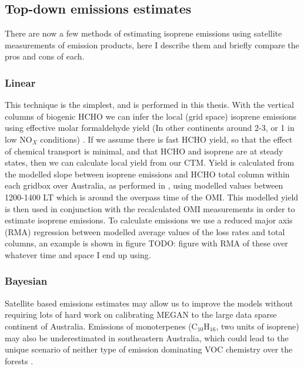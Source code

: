   \subsection{Top-down emissions estimates}
    There are now a few methods of estimating isoprene emissions using satellite measurements of emission products, here I describe them and briefly compare the pros and cons of each.
    
    \subsubsection{Linear}
      \label{BioIsop:intro:top_down_linear}
      
      This technique is the simplest, and is performed in this thesis.
      With the vertical columns of biogenic HCHO we can infer the local (grid space) isoprene emissions using effective molar formaldehyde yield (In other continents around 2-3, or 1 in low NO$_X$ conditions) \parencite{Palmer2003,Marais2012,Bauwens2016}.
      If we assume there is fast HCHO yield, so that the effect of chemical transport is minimal, and that HCHO and isoprene are at steady states, then we can calculate local yield from our CTM.
      Yield is calculated from the modelled slope between isoprene emissions and HCHO total column within each gridbox over Australia, as performed in \textcite{Palmer2003}, using modelled values between 1200-1400 LT which is around the overpass time of the OMI.
      This modelled yield is then used in conjunction with the recalculated OMI measurements in order to estimate isoprene emissions.
      To calculate emissions we use a reduced major axis (RMA) regression between modelled average values of the loss rates and total columns, an example is shown in figure TODO: figure with RMA of these over whatever time and space I end up using.
      
    
    \subsubsection{Bayesian}
      Satellite based emissions estimates may allow us to improve the models without requiring lots of hard work on calibrating MEGAN to the large data sparse continent of Australia.
      Emissions of monoterpenes (C$_10$H$_16$, two units of isoprene) may also be underestimated in southeastern Australia, which could lead to the unique scenario of neither type of emission dominating VOC chemistry over the forests \parencite{Emmerson2016}.
      
